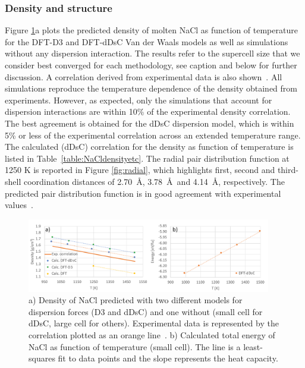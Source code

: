 \documentclass[titlepage=firstiscover,11pt,fleqn,headheight=14pt,footheight=40.8pt]{scrreprt}
\begin{document}
\subsubsection{Density and structure}
Figure \ref{fig:NaCldensity}a plots the predicted density of molten NaCl as function of temperature for the DFT-D3 and DFT-dDsC Van der Waals models as well as simulations without any dispersion interaction. The results refer to the supercell size that we consider best converged for each methodology, see caption and below for further discussion. A correlation derived from experimental data is also shown~\cite{Janz1988}. All simulations reproduce the temperature dependence of the density obtained from experiments. However, as expected, only the simulations that account for dispersion interactions are within 10\% of the experimental density correlation. The best agreement is obtained for the dDsC dispersion model, which is within 5\% or less of the experimental correlation across an extended temperature range. The calculated (dDsC) correlation for the density as function of temperature is listed in Table~\ref{table:NaCldensityetc}. 
The radial pair distribution function at 1250 K is reported in Figure \ref{fig:radial}, which highlights first, second and third-shell coordination distances of 2.70~\AA, 3.78~\AA~and 4.14~\AA, respectively. The predicted pair distribution function is in good agreement with experimental values~\cite{Edwards_1975}.

\begin{figure}[htb]
\centering
\includegraphics[width=0.95\textwidth]{FIG2.pdf}
\caption{a) Density of NaCl predicted with two different models for dispersion forces (D3 and dDsC) and one without (small cell for dDsC, large cell for others). Experimental data is represented by the correlation plotted as an orange line~\cite{Janz1988}. b) Calculated total energy of NaCl as function of temperature (small cell). The line is a least-squares fit to data points and the slope represents the heat capacity.} %
\label{fig:NaCldensity}
\end{figure}
\end{document}
